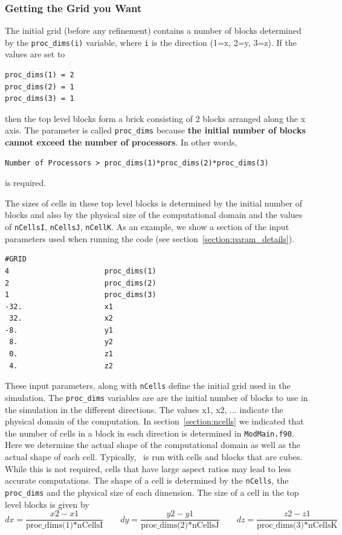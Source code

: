 \subsubsection{Getting the Grid you Want \label{section:proc_dims}}

The initial grid (before any refinement) contains
a number of blocks determined by the {\tt proc\_dims(i)} variable, where
{\tt i} is the direction (1=x, 2=y, 3=z).  If the values are set to
\begin{verbatim}
proc_dims(1) = 2
proc_dims(2) = 1
proc_dims(3) = 1
\end{verbatim}
then the top level blocks form a brick consisting of 2 blocks arranged along the
x axis.  
The parameter is called {\tt proc\_dims} because {\bf the initial
number of blocks cannot exceed the number of processors}.
In other words,
\begin{verbatim}
Number of Processors > proc_dims(1)*proc_dims(2)*proc_dims(3)
\end{verbatim}
is required.

The sizes of cells in these top level blocks is determined
by the initial number of blocks and
also by the physical size of the computational domain and the 
values of {\tt nCellsI}, {\tt nCellsJ}, {\tt nCellK}.
As an example, we show
a section of the input parameters used when running the code (see 
section~\ref{section:param_details}).
\begin{verbatim}
#GRID        
4                      proc_dims(1)
2                      proc_dims(2)
1                      proc_dims(3)
-32.                   x1 
 32.                   x2 
-8.                    y1 
 8.                    y2 
 0.                    z1 
 4.                    z2 
\end{verbatim}

These input parameters, along with  
{\tt nCells} define the initial grid used in the simulation.
The {\tt proc\_dims} variables are 
are the initial number of blocks to use in the simulation in the different
directions.  
The values x1, x2, ... indicate the physical 
domain of the computation.  In section~\ref{section:ncells}
we indicated that the number of cells in a block in each direction is determined
in {\tt ModMain.f90}.  Here we determine the actual shape of the computational
domain as well as the actual shape of each cell. Typically, \BATSRUS\ is
run with cells and blocks that are cubes.  While this is not required, 
cells that have large aspect ratios may lead to less accurate computations.  
The shape of a cell is
determined by the {\tt nCells}, the {\tt proc\_dims} and the physical size of 
each dimension. 
The size of a cell
in the top level blocks is given by 
\begin{equation}
dx = \frac{x2-x1}{\mbox{proc\_dims(1)}*\mbox{nCellsI}} \qquad
dy = \frac{y2-y1}{\mbox{proc\_dims(2)}*\mbox{nCellsJ}} \qquad
dz = \frac{z2-z1}{\mbox{proc\_dims(3)}*\mbox{nCellsK}}
\end{equation}

